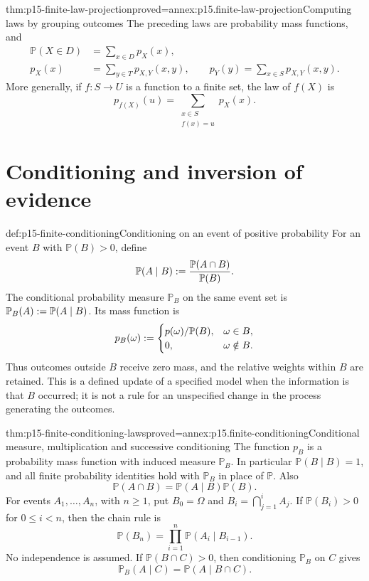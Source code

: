 \begin{hbtheorem}{thm:p15-finite-law-projection}{proved=annex:p15.finite-law-projection}{Computing laws by grouping outcomes}
The preceding laws are probability mass functions, and
\[
\begin{aligned}
\mathbb P(X\in D)&=\sum_{x\in D}p_X(x),\\
p_X(x)&=\sum_{y\in T}p_{X,Y}(x,y),\qquad
p_Y(y)=\sum_{x\in S}p_{X,Y}(x,y).
\end{aligned}
\]
More generally, if \(f:S\to U\) is a function to a finite set, the law
of \(f(X)\) is
\[
 p_{f(X)}(u)=\sum_{\substack{x\in S\\f(x)=u}}p_X(x).
\]
\end{hbtheorem}

\section{Conditioning and inversion of evidence}
\label{sec:p15-finite-conditioning}

\begin{hbdefinition}{def:p15-finite-conditioning}{Conditioning on an event of positive probability}
For an event \(B\) with \(\mathbb P(B)>0\), define
\[
 \mathbb P(A\mid B)\mathrel{:=}\frac{\mathbb P(A\cap B)}{\mathbb P(B)}.
\]
The conditional probability measure \(\mathbb P_B\) on the same event
set is \(\mathbb P_B(A)\mathrel{:=}\mathbb P(A\mid B)\). Its mass function is
\[
 p_B(\omega)\mathrel{:=}
 \begin{cases}
 p(\omega)/\mathbb P(B),&\omega\in B,\\
 0,&\omega\notin B.
 \end{cases}
\]
Thus outcomes outside \(B\) receive zero mass, and the relative weights
within \(B\) are retained. This is a defined update of a specified model
when the information is that \(B\) occurred; it is not a rule for an
unspecified change in the process generating the outcomes.
\end{hbdefinition}

\begin{hbtheorem}{thm:p15-finite-conditioning-laws}{proved=annex:p15.finite-conditioning}{Conditional measure, multiplication and successive conditioning}
The function \(p_B\) is a probability mass function with induced measure
\(\mathbb P_B\). In particular \(\mathbb P(B\mid B)=1\), and all
finite probability identities hold with \(\mathbb P_B\) in place of
\(\mathbb P\). Also
\[
 \mathbb P(A\cap B)=\mathbb P(A\mid B)\mathbb P(B).
\]
For events \(A_1,\ldots,A_n\), with \(n\geq1\), put
\(B_0=\Omega\) and \(B_i=\bigcap_{j=1}^i A_j\). If
\(\mathbb P(B_i)>0\) for \(0\leq i<n\), then the chain rule is
\[
 \mathbb P(B_n)=\prod_{i=1}^n\mathbb P(A_i\mid B_{i-1}).
\]
No independence is assumed. If \(\mathbb P(B\cap C)>0\), then
conditioning \(\mathbb P_B\) on \(C\) gives
\[
 \mathbb P_B(A\mid C)=\mathbb P(A\mid B\cap C).
\]
\end{hbtheorem}

